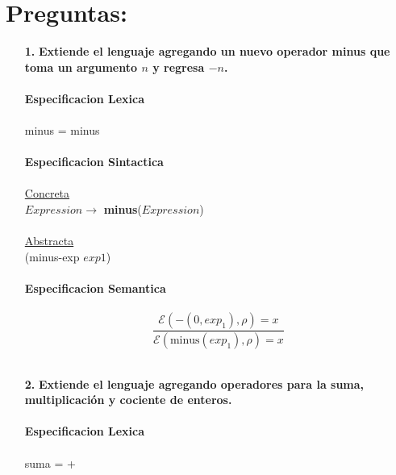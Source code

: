 \documentclass{article}
\begin{document}
\section{Preguntas:}
\begin{itemize} 
    \item[\textbf{1.}] \textbf{{\Large Extiende el lenguaje agregando un nuevo operador minus que toma un argumento $n$ y regresa $-n$.}}\\
    \\
    \textbf{Especificacion Lexica}\\
    \\
    \hspace*{10mm}minus = minus\\
    \\
    \textbf{Especificacion Sintactica}\\
    \\
    \hspace*{10mm}\underline{Concreta}\\
    \hspace*{10mm}$Expression\rightarrow$ \textbf{minus}($Expression$)\\
    \\
    \hspace*{10mm} \underline{Abstracta}\\
    \hspace*{10mm}(minus-exp $exp1$)\\
    \\
    \textbf{Especificacion Semantica}\\
    \\
    \hspace*{10mm}
        $$\frac
        {\mathcal{E}(-(0,exp_1),\rho)=x}
        {\mathcal{E}(\text{minus}(exp_1),\rho)=x}$$
        \hspace*{10mm}
    \\
    \item[\textbf{2.}] \textbf{{\Large Extiende el lenguaje agregando operadores para la suma, multiplicación y cociente de enteros.}}\\
    \\
    \textbf{Especificacion Lexica}\\
    \\
    \hspace*{10mm}suma = +\\

\end{itemize}
\end{document}

